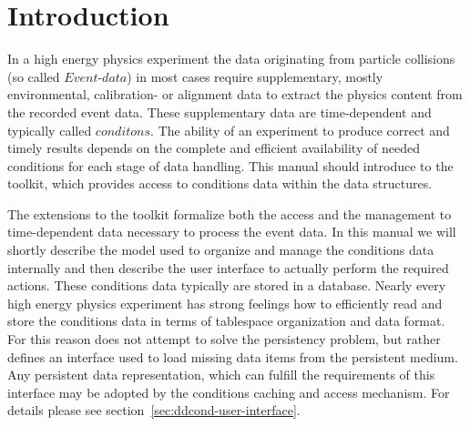 \documentclass[10pt,a4paper]{article}
\begin{document}
\clearpage
%
%
\tableofcontents
\clearpage
%
%
\setcounter{page}{1}

\section{Introduction}
\label{sec:ddcond-user-manual-introduction}
\noindent
In a high energy physics experiment the data originating from particle 
collisions (so called $Event$-$data$) in most cases require supplementary, 
mostly  environmental, calibration- or alignment data to extract the physics
content from the recorded event data. These supplementary data are 
time-dependent and  typically called $conditons$. The ability of an 
experiment to produce correct and timely results depends on the complete 
and efficient availability of  needed conditions for each stage of data 
handling. This manual should introduce to the \DDC toolkit, which provides 
access to conditions data within the \DDH data structures.

\noindent
The \DDC extensions to the \DDH toolkit formalize both the access and 
the management to time-dependent data necessary to process the event data.
In this manual we will shortly describe the model used to organize and manage 
the conditions data internally and then describe the user interface to
actually perform the required actions.
These conditions data typically are stored in a database. Nearly every
high energy physics experiment has strong feelings how to efficiently
read and store the conditions data in terms of tablespace organization 
and data format.
For this reason \DDC does not attempt to solve the persistency problem,
but rather defines an interface used to load missing data items from the 
persistent medium. Any persistent data representation, which can fulfill
the requirements of this interface may be adopted by the \DDC 
conditions caching and access mechanism. For details please see 
section~\ref{sec:ddcond-user-interface}.

\end{document}
